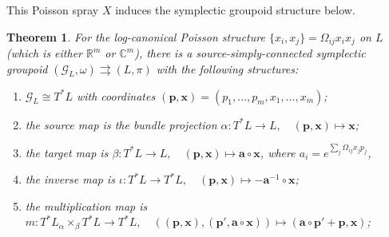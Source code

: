 \documentclass{amsart}
\newtheorem{theorem}{Theorem}[section]
\numberwithin{equation}{section}
\newcommand{\bfa}{\mathbf{a}}
\newcommand{\bfp}{\mathbf{p}}
\newcommand{\bfx}{\mathbf{x}}
\newcommand{\cG}{\mathcal{G}}
\newcommand{\CC}{\mathbb{C}}
\newcommand{\RR}{\mathbb{R}}
\newcommand{\rra}{\rightrightarrows}
\begin{document}
This Poisson spray $X$ induces the symplectic groupoid structure below.

\begin{theorem} \label{thm:PoiSpLogC}
For the log-canonical Poisson structure $\{x_i, x_j\} = \Omega_{ij} x_i x_j$ on $L$ (which is either $\RR^m$ or $\CC^m$),
there is a source-simply-connected symplectic groupoid $(\cG_L, \omega) \rra (L, \pi)$ with the following structures:
	\begin{enumerate}
		\item $\cG_L \cong T^*L$ with coordinates $(\bfp, \bfx) = (p_1, \ldots, p_m, x_1, \ldots, x_m)$;
		\item the source map is the bundle projection $\alpha: T^*L \to L, \quad (\bfp, \bfx) \mapsto \bfx$;
		\item the target map is $\beta: T^*L \to L, \quad (\bfp, \bfx) \mapsto \bfa \circ \bfx$,
			where $a_i = e^{\sum_j \Omega_{ij} x_jp_j}$, 
		\item the inverse map is $\iota: T^*L \to T^*L, \quad (\bfp, \bfx) \mapsto -\bfa^{-1}\circ \bfx$;
		\item the multiplication map is $m: T^*L {_\alpha \times_\beta} T^*L \to T^*L, \quad ((\bfp, \bfx), (\bfp', \bfa \circ \bfx)) \mapsto (\bfa \circ \bfp' + \bfp, \bfx )$;

\end{enumerate}
\end{theorem}
\end{document}
